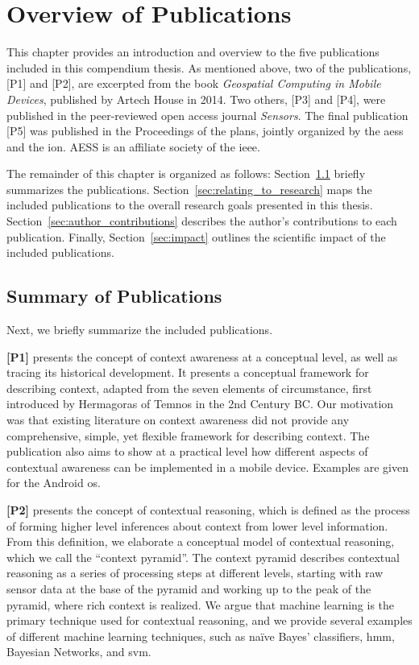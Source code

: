 \chapter{Overview of Publications}
\label{ch:overview_of_publications}

This chapter provides an introduction and overview to the five publications included in this compendium thesis. As mentioned above, two of the publications, [P1] and [P2], are excerpted from the book \emph{Geospatial Computing in Mobile Devices}, published by Artech House in 2014. Two others, [P3] and [P4], were published in the peer-reviewed open access journal \emph{Sensors}. The final publication [P5] was published in the Proceedings of the \gls{plans}, jointly organized by the \gls{aess} and the \gls{ion}. AESS is an affiliate society of the \gls{ieee}.

The remainder of this chapter is organized as follows: Section~\ref{sec:summary} briefly summarizes the publications. Section~\ref{sec:relating_to_research} maps the included publications to the overall research goals presented in this thesis. Section~\ref{sec:author_contributions} describes the author's contributions to each publication. Finally, Section~\ref{sec:impact} outlines the scientific impact of the included publications.

\section{Summary of Publications}
\label{sec:summary}

Next, we briefly summarize the included publications.

\textbf{[P1]} presents the concept of context awareness at a conceptual level, as well as tracing its historical development. It presents a conceptual framework for describing context, adapted from the seven elements of circumstance, first introduced by Hermagoras of Temnos in the 2nd Century BC. Our motivation was that existing literature on context awareness did not provide any comprehensive, simple, yet flexible framework for describing context. The publication also aims to show at a practical level how different aspects of contextual awareness can be implemented in a mobile device. Examples are given for the Android \gls{os}.

\textbf{[P2]} presents the concept of contextual reasoning, which is defined as the process of forming higher level inferences about context from lower level information. From this definition, we elaborate a conceptual model of contextual reasoning, which we call the ``context pyramid''. The context pyramid describes contextual reasoning as a series of processing steps at different levels, starting with raw sensor data at the base of the pyramid and working up to the peak of the pyramid, where rich context is realized. We argue that machine learning is the primary technique used for contextual reasoning, and we provide several examples of different machine learning techniques, such as  na\"{i}ve Bayes’ classifiers, \gls{hmm}, Bayesian Networks, and \gls{svm}.

